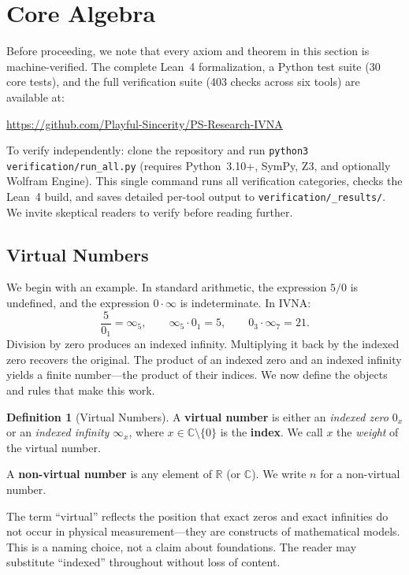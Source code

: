 \documentclass[12pt]{article}
\theoremstyle{definition}
\newtheorem{definition}[theorem]{Definition}
\theoremstyle{remark}
\newcommand{\vz}[1]{0_{#1}}             %
\newcommand{\vi}[1]{\infty_{#1}}        %
\newcommand{\R}{\mathbb{R}}
\newcommand{\C}{\mathbb{C}}
\begin{document}
\section{Core Algebra}
\label{sec:core}

Before proceeding, we note that every axiom and theorem in this section
is machine-verified. The complete Lean~4 formalization, a Python test
suite (30 core tests), and the full verification suite (403 checks
across six tools) are available at:

\begin{center}
\url{https://github.com/Playful-Sincerity/PS-Research-IVNA}
\end{center}

\noindent
To verify independently: clone the repository and run
\texttt{python3 verification/run\_all.py} (requires Python~3.10+,
SymPy, Z3, and optionally Wolfram Engine). This single command runs
all verification categories, checks the Lean~4 build, and saves
detailed per-tool output to \texttt{verification/\_results/}.
We invite skeptical readers to verify before reading further.

\subsection{Virtual Numbers}

We begin with an example. In standard arithmetic, the expression
$5 / 0$ is undefined, and the expression $0 \cdot \infty$ is
indeterminate. In IVNA:
\[
\frac{5}{\vz{1}} = \vi{5}, \qquad
\vi{5} \cdot \vz{1} = 5, \qquad
\vz{3} \cdot \vi{7} = 21.
\]
Division by zero produces an indexed infinity. Multiplying it back
by the indexed zero recovers the original. The product of an indexed
zero and an indexed infinity yields a finite number---the product of
their indices. We now define the objects and rules that make this work.

\begin{definition}[Virtual Numbers]
\label{def:virtual}
A \textbf{virtual number} is either an \emph{indexed zero} $\vz{x}$ or an
\emph{indexed infinity} $\vi{x}$, where $x \in \C \setminus \{0\}$ is the
\textbf{index}. We call $x$ the \emph{weight} of the virtual number.

A \textbf{non-virtual number} is any element of $\R$ (or $\mathbb{C}$).
We write $n$ for a non-virtual number.

The term ``virtual'' reflects the position that exact zeros and exact
infinities do not occur in physical measurement---they are constructs of
mathematical models. This is a naming choice, not a claim about
foundations. The reader may substitute ``indexed'' throughout without
loss of content.
\end{definition}
\end{document}
